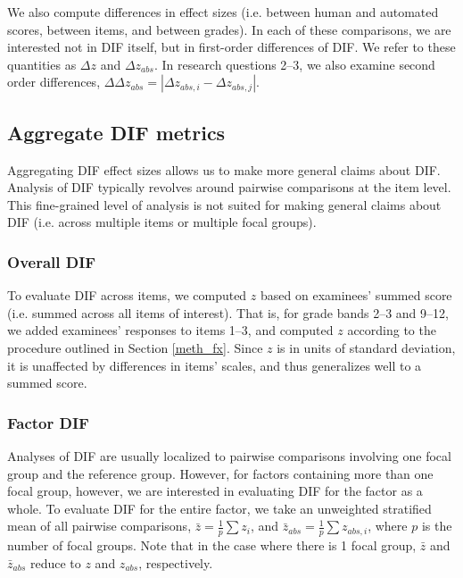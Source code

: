 \documentclass [PhD] {uclathes}
\begin{document}
We also compute differences in effect sizes (i.e. between human and automated scores, between items, and between grades). In each of these comparisons, we are interested not in DIF itself, but in first-order differences of DIF. We refer to these quantities as $\Delta z$ and $\Delta z_{abs}$. In research questions 2–3, we also examine second order differences, $\Delta \Delta z_{abs} = |\Delta z_{abs,i} - \Delta z_{abs,j}|$.

\subsection{Aggregate DIF metrics}

Aggregating DIF effect sizes allows us to make more general claims about DIF. Analysis of DIF typically revolves around pairwise comparisons at the item level. This fine-grained level of analysis is not suited for making general claims about DIF (i.e. across multiple items or multiple focal groups).

\subsubsection{Overall DIF}

To evaluate DIF across items, we computed $z$ based on examinees’ summed score (i.e. summed across all items of interest). That is, for grade bands 2–3 and 9–12, we added examinees’ responses to items 1–3, and computed $z$ according to the procedure outlined in Section \ref{meth_fx}. Since $z$ is in units of standard deviation, it is unaffected by differences in items’ scales, and thus generalizes well to a summed score.

\subsubsection{Factor DIF}

Analyses of DIF are usually localized to pairwise comparisons involving one focal group and the reference group. However, for factors containing more than one focal group, however, we are interested in evaluating DIF for the factor as a whole. To evaluate DIF for the entire factor, we take an unweighted stratified mean of all pairwise comparisons, $\bar{z} = \frac{1}{p} \sum{z_i}$, and $\bar{z}_{abs} = \frac{1}{p} \sum{z_{abs,i}}$, where $p$ is the number of focal groups. Note that in the case where there is 1 focal group, $\bar{z}$ and $\bar{z}_{abs}$ reduce to $z$ and $z_{abs}$, respectively.
\end{document}
